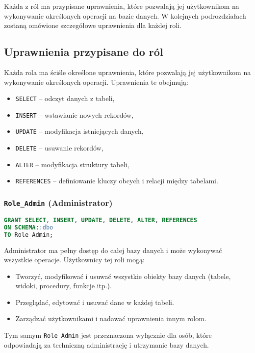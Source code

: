 \documentclass[12pt]{article}
\begin{document}
\noindent Każda z ról ma przypisane uprawnienia, które pozwalają jej użytkownikom na wykonywanie określonych operacji na bazie danych. W kolejnych podrozdziałach zostaną omówione szczegółowe uprawnienia dla każdej roli.

\subsection{Uprawnienia przypisane do ról}

Każda rola ma ściśle określone uprawnienia, które pozwalają jej użytkownikom na wykonywanie określonych operacji. Uprawnienia te obejmują:
\begin{itemize}
    \item \texttt{SELECT} -- odczyt danych z tabeli,
    \item \texttt{INSERT} -- wstawianie nowych rekordów,
    \item \texttt{UPDATE} -- modyfikacja istniejących danych,
    \item \texttt{DELETE} -- usuwanie rekordów,
    \item \texttt{ALTER} -- modyfikacja struktury tabeli,
    \item \texttt{REFERENCES} -- definiowanie kluczy obcych i relacji między tabelami.
\end{itemize}

\newpage

\subsubsection{\texttt{Role\_Admin} (Administrator)}

\begin{lstlisting}[language=SQL]
GRANT SELECT, INSERT, UPDATE, DELETE, ALTER, REFERENCES 
ON SCHEMA::dbo 
TO Role_Admin;
\end{lstlisting}

\noindent Administrator ma pełny dostęp do całej bazy danych i może wykonywać wszystkie operacje. Użytkownicy tej roli mogą:
\begin{itemize}
    \item Tworzyć, modyfikować i usuwać wszystkie obiekty bazy danych (tabele, widoki, procedury, funkcje itp.).
    \item Przeglądać, edytować i usuwać dane w każdej tabeli.
    \item Zarządzać użytkownikami i nadawać uprawnienia innym rolom.
\end{itemize}
Tym samym \texttt{Role\_Admin} jest przeznaczona wyłącznie dla osób, które odpowiadają za techniczną administrację i utrzymanie bazy danych.
\end{document}
